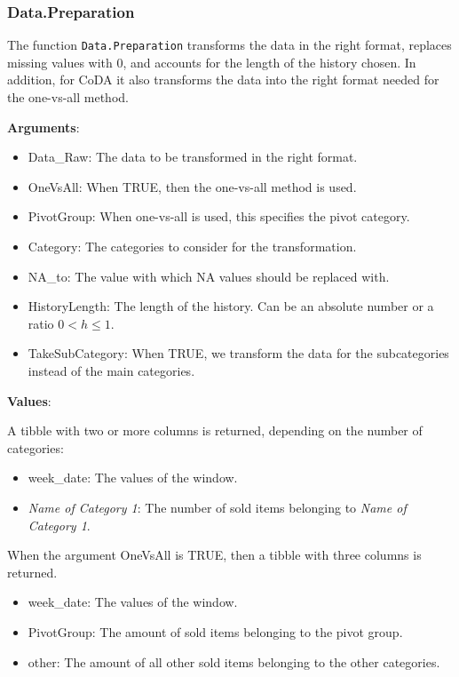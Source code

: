 \subsubsection{Data.Preparation}
\label{sec:Data.Preparation}

The function \texttt{Data.Preparation} transforms the data in the right format, replaces missing values with 0, and accounts for the length of the history chosen. In addition, for CoDA it also transforms the data into the right format needed for the one-vs-all method.

\textbf{Arguments}:

\begin{itemize}
	\item Data\_Raw: The data to be transformed in the right format.
  \item OneVsAll: When TRUE, then the one-vs-all method is used.
  \item PivotGroup: When one-vs-all is used, this specifies the pivot category.
  \item Category: The categories to consider for the transformation.
  \item NA\_to: The value with which NA values should be replaced with.
  \item HistoryLength: The length of the history. Can be an absolute number or a ratio $0<h\leq 1$. 
  \item TakeSubCategory: When TRUE, we transform the data for the subcategories instead of the main categories. 
\end{itemize}

\textbf{Values}:

A tibble with two or more columns is returned, depending on the number of categories: 

\begin{itemize}
	\item week\_date: The values of the window.
	\item \textit{Name of Category 1}: The number of sold items belonging to \textit{Name of Category 1}.
\end{itemize}

When the argument OneVsAll is TRUE, then a tibble with three columns is returned.


\begin{itemize}
	\item week\_date: The values of the window.
	\item PivotGroup: The amount of sold items belonging to the pivot group.
	\item other: The amount of all other sold items belonging to the other categories. 
\end{itemize}


